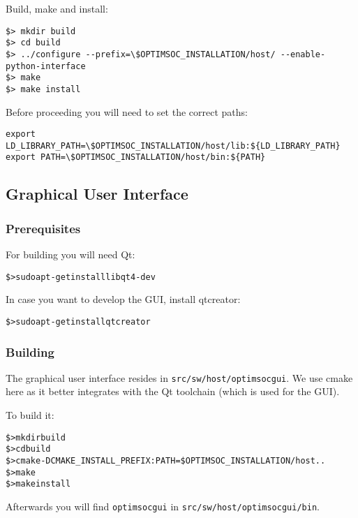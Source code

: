 Build, make and install:

\begin{verbatim}
$> mkdir build
$> cd build
$> ../configure --prefix=\$OPTIMSOC_INSTALLATION/host/ --enable-python-interface
$> make
$> make install
\end{verbatim}

Before proceeding you will need to set the correct paths:

\begin{verbatim}
export LD_LIBRARY_PATH=\$OPTIMSOC_INSTALLATION/host/lib:${LD_LIBRARY_PATH}
export PATH=\$OPTIMSOC_INSTALLATION/host/bin:${PATH}
\end{verbatim}

\subsection{Graphical User Interface}

\subsubsection{Prerequisites}

For building you will need Qt:

\begin{alltt}
\$> sudo apt-get install libqt4-dev
\end{alltt}

In case you want to develop the GUI, install qtcreator:

\begin{alltt}
\$> sudo apt-get install qtcreator
\end{alltt}

\subsubsection{Building}

The graphical user interface resides in
\verb|src/sw/host/optimsocgui|. We use cmake here as it better
integrates with the Qt toolchain (which is used for the GUI).

To build it:

\begin{alltt}
\$> mkdir build
\$> cd build
\$> cmake -DCMAKE_INSTALL_PREFIX:PATH=\$OPTIMSOC_INSTALLATION/host ..
\$> make
\$> make install
\end{alltt}

Afterwards you will find \verb|optimsocgui| in
\verb|src/sw/host/optimsocgui/bin|.

